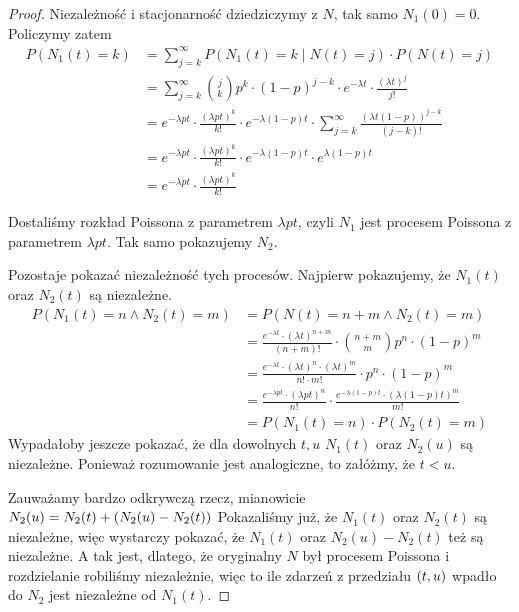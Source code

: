 \begin{proof}
	Niezależność i stacjonarność dziedziczymy z \( N \), tak samo \( N_1(0) = 0 \).
	Policzymy zatem
	\begin{align*}
		P(N_1(t) = k)
		 & = \sum_{j=k}^\infty P(N_1(t) = k \mid N(t) = j) \cdot P(N(t) = j)                                             \\
		 & = \sum_{j=k}^\infty \binom{j}{k} p^k \cdot (1-p)^{j-k} \cdot e^{-\lambda t} \cdot \frac{(\lambda t)^j}{j!}    \\
		 & = e^{-\lambda p t} \cdot \frac{(\lambda p t)^k}{k!} \cdot e^{-\lambda (1 - p) t} \cdot
		\sum_{j=k}^\infty \frac{(\lambda t (1 - p))^{j-k}}{(j-k)!}                                                       \\
		 & = e^{-\lambda p t} \cdot \frac{(\lambda p t)^k}{k!} \cdot e^{-\lambda (1 - p) t}  \cdot e^{\lambda (1 - p) t} \\
		 & = e^{-\lambda p t} \cdot \frac{(\lambda p t)^k}{k!}
	\end{align*}

	Dostaliśmy rozkład Poissona z parametrem \( \lambda p t \), czyli \( N_1 \) jest procesem Poissona z parametrem \( \lambda p t \). Tak samo pokazujemy \( N_2 \).

	Pozostaje pokazać niezależność tych procesów.
	Najpierw pokazujemy, że \( N_1(t) \) oraz \( N_2(t) \) są niezależne.
	\begin{align*}
		P(N_1(t) = n \land N_2(t) = m)
		 & = P(N(t) = n + m \land N_2(t) = m)                                                                                  \\
		 & = \frac{e^{-\lambda t}\cdot(\lambda t)^{n + m}}{(n + m)!} \cdot \binom{n + m}{m} p^n \cdot (1-p)^m                  \\
		 & = \frac{e^{-\lambda t}\cdot(\lambda t)^n \cdot (\lambda t)^m}{n! \cdot m!} \cdot p^n \cdot (1-p)^m                  \\
		 & = \frac{e^{-\lambda p t} \cdot (\lambda p t)^n}{n!} \cdot \frac{e^{-\lambda (1-p) t} \cdot (\lambda (1-p) t)^m}{m!} \\
		 & = P(N_1(t) = n) \cdot P(N_2(t) = m)
	\end{align*}
	Wypadałoby jeszcze pokazać, że dla dowolnych \(t, u\) \( N_1(t) \) oraz \( N_2(u) \) są niezależne.
	Ponieważ rozumowanie jest analogiczne, to załóżmy, że \( t < u \).

	Zauważamy bardzo odkrywczą rzecz, mianowicie \( N_2(u) = N_2(t) + \left(N_2(u) - N_2(t)\right) \)
	Pokazaliśmy już, że \( N_1(t) \) oraz \( N_2(t) \) są niezależne, więc wystarczy pokazać, że
	\( N_1(t) \) oraz \(N_2(u) - N_2(t)\) też są niezależne.
	A tak jest, dlatego, że oryginalny \( N \) był procesem Poissona i rozdzielanie robiliśmy niezależnie, więc to ile zdarzeń z przedziału \( \left(t, u\right) \) wpadło do \( N_2 \) jest niezależne od \( N_1(t) \).
\end{proof}
